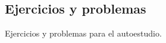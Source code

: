 \subsection*{Ejercicios y problemas}

Ejercicios y problemas para el autoestudio.

\begin{exercise}
\end{exercise}

\begin{problem-wos}
\end{problem-wos}